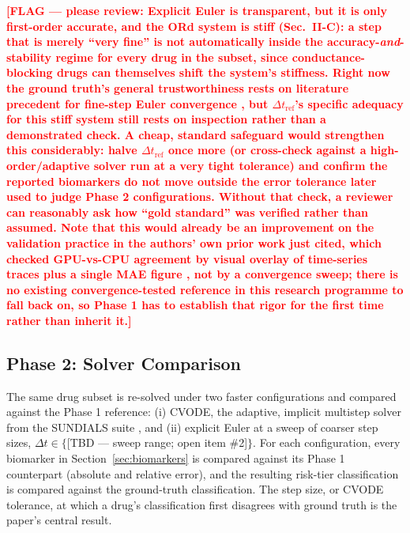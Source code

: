 \documentclass[journal]{IEEEtran}
\newcommand{\flag}[1]{\textcolor{red}{\textbf{[FLAG --- please review: #1]}}}
\begin{document}
\flag{Explicit Euler is transparent, but it is only first-order accurate, and the ORd system is stiff (Sec.~II-C): a step that is merely ``very fine'' is not automatically inside the accuracy-\emph{and}-stability regime for every drug in the subset, since conductance-blocking drugs can themselves shift the system's stiffness. Right now the ground truth's general trustworthiness rests on literature precedent for fine-step Euler convergence \cite{eulerprecision2013}, but $\Delta t_{\text{ref}}$'s specific adequacy for this stiff system still rests on inspection rather than a demonstrated check. A cheap, standard safeguard would strengthen this considerably: halve $\Delta t_{\text{ref}}$ once more (or cross-check against a high-order/adaptive solver run at a very tight tolerance) and confirm the reported biomarkers do not move outside the error tolerance later used to judge Phase 2 configurations. Without that check, a reviewer can reasonably ask how ``gold standard'' was verified rather than assumed. Note that this would already be an improvement on the validation practice in the authors' own prior work just cited, which checked GPU-vs-CPU agreement by visual overlay of time-series traces plus a single MAE figure \cite{pramawijaya2024thesis}, not by a convergence sweep; there is no existing convergence-tested reference in this research programme to fall back on, so Phase 1 has to establish that rigor for the first time rather than inherit it.}

\subsection{Phase 2: Solver Comparison}

The same drug subset is re-solved under two faster configurations and compared against the Phase 1 reference: (i) CVODE, the adaptive, implicit multistep solver from the SUNDIALS suite \cite{hindmarsh2005}, and (ii) explicit Euler at a sweep of coarser step sizes, $\Delta t \in \{$[TBD --- sweep range; open item \#2]$\}$. For each configuration, every biomarker in Section~\ref{sec:biomarkers} is compared against its Phase 1 counterpart (absolute and relative error), and the resulting risk-tier classification is compared against the ground-truth classification. The step size, or CVODE tolerance, at which a drug's classification first disagrees with ground truth is the paper's central result.
\end{document}
